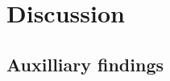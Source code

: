 \chapter{Discussion}\label{discussion}
\setcounter{chapter}{6}
\section{}
\section{Auxilliary findings}